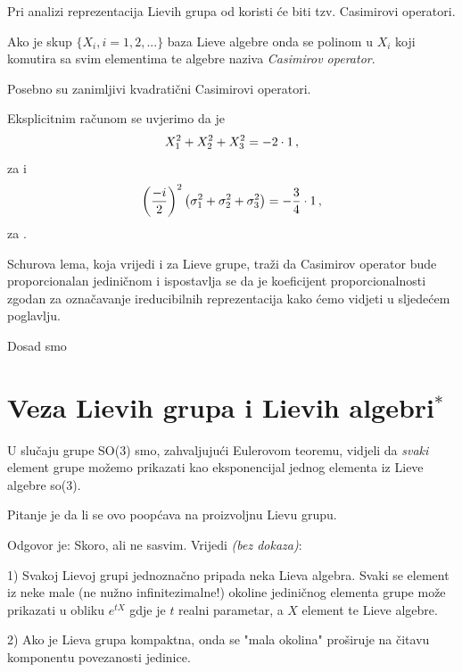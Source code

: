 Pri analizi reprezentacija Lievih grupa od koristi će biti
tzv. Casimirovi operatori.
\begin{definicija}
Ako je skup $\{X_i, i=1,2, ... \}$ baza Lieve algebre onda se polinom
u $X_i$ koji komutira sa svim elementima te algebre naziva 
\emph{Casimirov operator}.
\end{definicija}
Posebno su zanimljivi kvadratični Casimirovi operatori.
\begin{primjer}
 Eksplicitnim računom se uvjerimo da je 
\begin{equation}
X_{1}^2 + X_{2}^2 + X_{3}^2 = -2\cdot 1 \,,
\end{equation}
    za  i
\begin{equation}
    \left(\frac{-i}{2}\right)^2
    \big(\sigma_{1}^2 + \sigma_{2}^2 + \sigma_{3}^2\big) = -\frac{3}{4} \cdot 1 \,,
\end{equation}
    za .
\end{primjer}
Schurova lema, koja vrijedi i za Lieve grupe, traži da Casimirov operator 
bude proporcionalan jediničnom i ispostavlja se da je koeficijent proporcionalnosti
zgodan za označavanje ireducibilnih reprezentacija kako ćemo vidjeti u sljedećem poglavlju.


Dosad smo 






\section{Veza Lievih grupa i Lievih algebri$^*$}

U slučaju grupe SO(3) smo, zahvaljujući Eulerovom teoremu, vidjeli da
\emph{svaki} element grupe možemo prikazati kao eksponencijal jednog
elementa iz Lieve algebre so(3).

Pitanje je da li se ovo poopćava na proizvoljnu Lievu grupu.

Odgovor je: Skoro, ali ne sasvim. Vrijedi \emph{(bez dokaza)}:

1) Svakoj Lievoj grupi jednoznačno pripada neka Lieva algebra. Svaki 
  se element iz neke male (ne nužno infinitezimalne!) okoline 
  jediničnog elementa grupe može
  prikazati u obliku $e^{t X}$ gdje je $t$ realni parametar, a $X$ element
  te Lieve algebre.

2) Ako je Lieva grupa kompaktna, onda se "mala okolina" proširuje na
   čitavu komponentu povezanosti jedinice.

